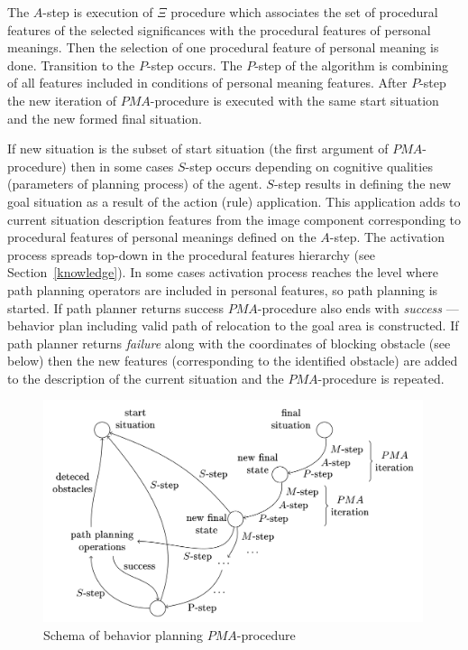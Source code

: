 \documentclass[runningheads,a4paper]{llncs}
\begin{document}
The $A$-step is execution of $\Xi$ procedure which associates the set of procedural features of the selected significances  with the procedural features of personal meanings. Then the selection of one procedural feature of personal meaning is done. Transition to the $P$-step occurs. The $P$-step of the algorithm is combining of all features included in conditions of personal meaning features. After $P$-step the new iteration of $PMA$-procedure is executed with the same start situation and the new formed final situation.

If new situation is the subset of start situation (the first argument of $PMA$-procedure) then in some cases $S$-step occurs depending on cognitive qualities (parameters of planning process) of the agent. $S$-step results in defining the new goal situation as a result of the action (rule) application. This application adds to current situation description features from the image component corresponding to procedural features of personal meanings defined on the $A$-step. The activation process spreads top-down in the procedural features hierarchy (see Section~\ref{knowledge}). In some cases activation process reaches the level where path planning operators are included in personal features, so path planning is started. If path planner returns success $PMA$-procedure also ends with \textit{success} --- behavior plan including valid path of relocation to the goal area is constructed. If path planner returns \textit{failure} along with the coordinates of blocking obstacle (see below) then the new features (corresponding to the identified obstacle) are added to the description of the current situation and the $PMA$-procedure is repeated.

\begin{figure}
	\centering
	\includegraphics[height=6.5cm]{beh_plan}
	\caption{Schema of behavior planning $PMA$-procedure}
	\label{fig:bplan}
\end{figure}
\end{document}
